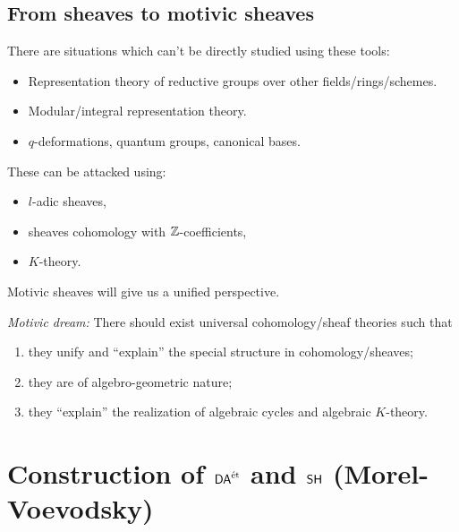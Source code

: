 \subsection{From sheaves to motivic sheaves}
There are situations which can't be directly studied using these tools:
\begin{itemize}
\item Representation theory of reductive groups over other fields/rings/schemes.
\item Modular/integral representation theory.
\item $q$-deformations, quantum groups, canonical bases.
\end{itemize}
These can be attacked using:
\begin{itemize}
\item $l$-adic sheaves,
\item sheaves cohomology with $\mathbb Z$-coefficients,
\item $K$-theory.
\end{itemize}
Motivic sheaves will give us a unified perspective.

\emph{Motivic dream:} There should exist universal cohomology/sheaf theories such that
\begin{enumerate}[1)]
\item they unify and ``explain'' the special structure in cohomology/sheaves;
\item they are of algebro-geometric nature;
\item they ``explain'' the realization of algebraic cycles and algebraic $K$-theory.
\end{enumerate}

\section{Construction of \texorpdfstring{$\mathsf{DA}^\text{\'et}$}{DA\'et} and \texorpdfstring{$\mathsf{SH}$}{SH}
(Morel-Voevodsky)}
